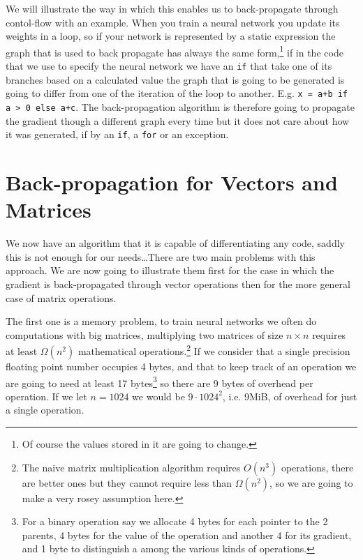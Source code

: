 \documentclass{article}
\begin{document}
\iffalse
\begin{verbatim}
let G = (V, E) be the DAG
let v[] = reverse_topo_sort(graph)
v[:].grad = 0; v[0].grad = 1
for j in v:
	for i in {i : (j, i) in E}:
		v[i].grad += vJp(v[j].grad, i)
\end{verbatim}
\fi

We will illustrate the way in which this enables us to back-propagate through
contol-flow with an example. When you train a neural network you update its
weights in a loop, so if your network is represented by a static expression the
graph that is used to back propagate has always the same form,\footnote {Of
course the values stored in it are going to change.} if in the code that we use
to specify the neural network we have an \texttt{if} that take one of its
branches based on a calculated value the graph that is going to be generated is
going to differ from one of the iteration of the loop to another. E.g. \texttt
{x = a+b if a > 0 else a+c}. The back-propagation algorithm is therefore going
to propagate the gradient though a different graph every time but it does not
care about how it was generated, if by an \texttt{if}, a \texttt{for} or an
exception.

\section{Back-propagation for Vectors and Matrices}

We now have an algorithm that it is capable of differentiating any code, saddly
this is not enough for our needs\dots There are two main problems with this
approach. We are now going to illustrate them first for the case in which the
gradient is back-propagated through vector operations then for the more general
case of matrix operations.

The first one is a memory problem, to train neural networks we often do
computations with big matrices, multiplying two matrices of size \(n \times n\)
requires at least \(\Omega(n^2)\) mathematical operations.\footnote{The
naive matrix multiplication algorithm requires \(O(n^3)\) operations, there are
better ones but they cannot require less than \(\Omega(n^2)\), so we are going
to make a very rosey assumption here.} If we consider that a single precision
floating point number occupies 4 bytes, and that to keep track of an operation
we are going to need at least 17 bytes\footnote{For a binary operation say we
allocate 4 bytes for each pointer to the 2 parents, 4 bytes for the value of the
operation and another 4 for its gradient, and 1 byte to distinguish a among the
various kinds of operations.} so there are 9 bytes of overhead per operation.
If we let \(n=1024\) we would be \(9 \cdot 1024^2\), i.e. 9MiB, of overhead for
just a single operation.
\end{document}
